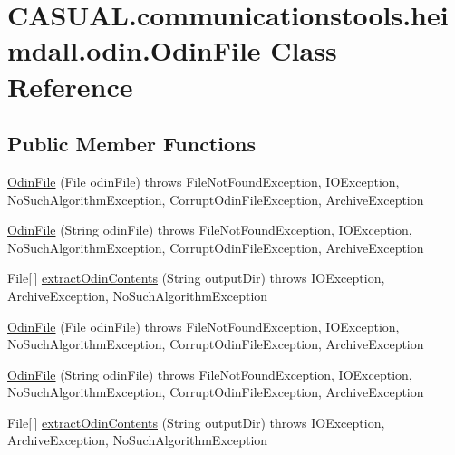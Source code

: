 \hypertarget{class_c_a_s_u_a_l_1_1communicationstools_1_1heimdall_1_1odin_1_1_odin_file}{\section{C\-A\-S\-U\-A\-L.\-communicationstools.\-heimdall.\-odin.\-Odin\-File Class Reference}
\label{class_c_a_s_u_a_l_1_1communicationstools_1_1heimdall_1_1odin_1_1_odin_file}
}
\subsection*{Public Member Functions}
\begin{DoxyCompactItemize}
\item 
\hyperlink{class_c_a_s_u_a_l_1_1communicationstools_1_1heimdall_1_1odin_1_1_odin_file_a0753c2e8b53144c071b02f94f76f7708}{Odin\-File} (File odin\-File)  throws File\-Not\-Found\-Exception, I\-O\-Exception, No\-Such\-Algorithm\-Exception, Corrupt\-Odin\-File\-Exception, Archive\-Exception 
\item 
\hyperlink{class_c_a_s_u_a_l_1_1communicationstools_1_1heimdall_1_1odin_1_1_odin_file_aea91cec4bf61aaefaa03230c2cff8a61}{Odin\-File} (String odin\-File)  throws File\-Not\-Found\-Exception, I\-O\-Exception, No\-Such\-Algorithm\-Exception, Corrupt\-Odin\-File\-Exception, Archive\-Exception 
\item 
File\mbox{[}$\,$\mbox{]} \hyperlink{class_c_a_s_u_a_l_1_1communicationstools_1_1heimdall_1_1odin_1_1_odin_file_a534987a992e4591605d789f564c88e90}{extract\-Odin\-Contents} (String output\-Dir)  throws I\-O\-Exception, Archive\-Exception, No\-Such\-Algorithm\-Exception 
\item 
\hyperlink{class_c_a_s_u_a_l_1_1communicationstools_1_1heimdall_1_1odin_1_1_odin_file_a0753c2e8b53144c071b02f94f76f7708}{Odin\-File} (File odin\-File)  throws File\-Not\-Found\-Exception, I\-O\-Exception, No\-Such\-Algorithm\-Exception, Corrupt\-Odin\-File\-Exception, Archive\-Exception 
\item 
\hyperlink{class_c_a_s_u_a_l_1_1communicationstools_1_1heimdall_1_1odin_1_1_odin_file_aea91cec4bf61aaefaa03230c2cff8a61}{Odin\-File} (String odin\-File)  throws File\-Not\-Found\-Exception, I\-O\-Exception, No\-Such\-Algorithm\-Exception, Corrupt\-Odin\-File\-Exception, Archive\-Exception 
\item 
File\mbox{[}$\,$\mbox{]} \hyperlink{class_c_a_s_u_a_l_1_1communicationstools_1_1heimdall_1_1odin_1_1_odin_file_a534987a992e4591605d789f564c88e90}{extract\-Odin\-Contents} (String output\-Dir)  throws I\-O\-Exception, Archive\-Exception, No\-Such\-Algorithm\-Exception 
\end{DoxyCompactItemize}


